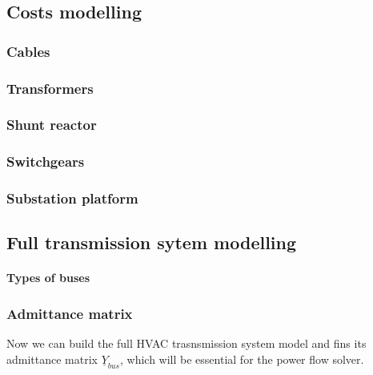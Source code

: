 \documentclass[a4paper,11pt, titlepage, twoside]{article}
\begin{document}
\subsection{Costs modelling}
\subsubsection{Cables}
\subsubsection{Transformers}
\subsubsection{Shunt reactor}
\subsubsection{Switchgears}
\subsubsection{Substation platform}


\subsection{Full transmission sytem modelling}

\paragraph{Types of buses}

\subsubsection{Admittance matrix}
Now we can build the full HVAC trasnsmission system model and fins its admittance matrix $\underline{Y}_{bus}$, which will be essential
for the power flow solver.
\end{document}
